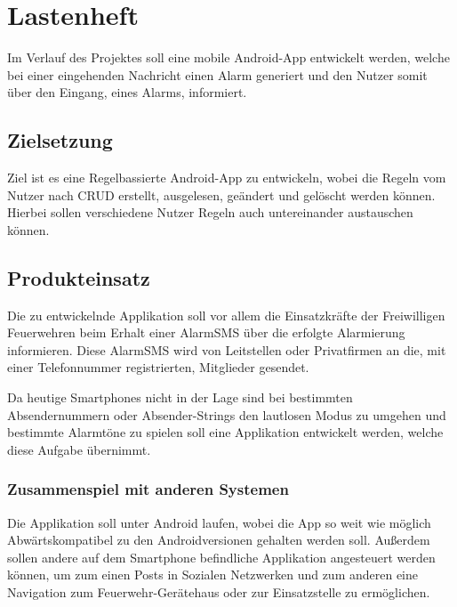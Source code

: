 \section{Lastenheft}
Im Verlauf des Projektes soll eine mobile Android-App entwickelt werden, welche bei einer eingehenden Nachricht einen Alarm generiert und den Nutzer somit \"uber den Eingang, eines Alarms, informiert.

\subsection{Zielsetzung}
Ziel ist es eine Regelbassierte Android-App zu entwickeln, wobei die Regeln vom Nutzer nach CRUD erstellt, ausgelesen, ge\"andert und gel\"oscht werden k\"onnen. Hierbei sollen verschiedene Nutzer Regeln auch untereinander austauschen k\"onnen.

\subsection{Produkteinsatz}
Die zu entwickelnde Applikation soll vor allem die Einsatzkr\"afte der Freiwilligen Feuerwehren beim Erhalt einer AlarmSMS \"uber die erfolgte Alarmierung informieren. Diese AlarmSMS wird von Leitstellen oder Privatfirmen an die, mit einer Telefonnummer registrierten, Mitglieder gesendet.

Da heutige Smartphones nicht in der Lage sind bei bestimmten Absendernummern oder Absender-Strings den lautlosen Modus zu umgehen und bestimmte Alarmt\"one zu spielen soll eine Applikation entwickelt werden, welche diese Aufgabe \"ubernimmt.

\subsubsection{Zusammenspiel mit anderen Systemen}
Die Applikation soll unter Android laufen, wobei die App so weit wie m\"oglich Abw\"artskompatibel zu den Androidversionen gehalten werden soll. Au\ss{}erdem sollen andere auf dem Smartphone befindliche Applikation angesteuert werden k\"onnen, um zum einen Posts in Sozialen Netzwerken und zum anderen eine Navigation zum Feuerwehr-Ger\"atehaus oder zur Einsatzstelle zu erm\"oglichen.

